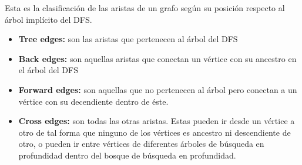 Esta es la clasificaci\'on de las aristas de un grafo seg\'un su posici\'on respecto 
al \'arbol impl\'icito del DFS.
	
\begin{itemize}
	\item{ \textbf{Tree edges: }
		son las aristas que pertenecen al \'arbol del DFS
	}
	\item{ \textbf{Back edges: }
		 son aquellas aristas que conectan un v\'ertice con su ancestro en el \'arbol del DFS
	}
	\item{ \textbf{Forward edges: }
		 son aquellas que no pertenecen al \'arbol pero conectan a un v\'ertice con
		 su decendiente dentro de \'este.
	}
	\item{ \textbf{Cross edges: }
		 son todas las otras aristas. Estas pueden ir desde un v\'ertice a otro de tal
		 forma que ninguno de los v\'ertices es ancestro ni descendiente de otro, o pueden ir 
		 entre v\'ertices de diferentes \'arboles de b\'usqueda en profundidad dentro del bosque de 
		 b\'usqueda en profundidad.

	}

\end{itemize}
